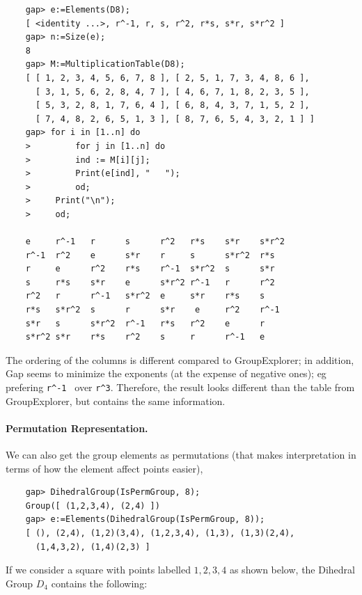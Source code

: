 \begin{verbatim}
    gap> e:=Elements(D8);
    [ <identity ...>, r^-1, r, s, r^2, r*s, s*r, s*r^2 ]
    gap> n:=Size(e);
    8
    gap> M:=MultiplicationTable(D8);
    [ [ 1, 2, 3, 4, 5, 6, 7, 8 ], [ 2, 5, 1, 7, 3, 4, 8, 6 ], 
	  [ 3, 1, 5, 6, 2, 8, 4, 7 ], [ 4, 6, 7, 1, 8, 2, 3, 5 ], 
      [ 5, 3, 2, 8, 1, 7, 6, 4 ], [ 6, 8, 4, 3, 7, 1, 5, 2 ], 
	  [ 7, 4, 8, 2, 6, 5, 1, 3 ], [ 8, 7, 6, 5, 4, 3, 2, 1 ] ]
    gap> for i in [1..n] do
    >         for j in [1..n] do
    >         ind := M[i][j];
    >         Print(e[ind], "   ");
    >         od;
    >     Print("\n");
    >     od;

    e     r^-1   r      s      r^2   r*s    s*r    s*r^2   
    r^-1  r^2    e      s*r    r     s      s*r^2  r*s   
    r     e      r^2    r*s    r^-1  s*r^2  s      s*r   
    s     r*s    s*r    e      s*r^2 r^-1   r      r^2   
    r^2   r      r^-1   s*r^2  e     s*r    r*s    s   
    r*s   s*r^2  s      r      s*r    e     r^2    r^-1   
    s*r   s      s*r^2  r^-1   r*s   r^2    e      r   
    s*r^2 s*r    r*s    r^2    s     r      r^-1   e   
\end{verbatim}

The ordering of the columns is different compared to GroupExplorer; in addition, Gap seems to minimize the exponents (at the expense of negative ones); eg prefering \verb+r^-1 + over \verb+r^3+. Therefore, the result looks different than the table from GroupExplorer, but contains the same information.

\paragraph{Permutation Representation.} We can also get the group elements as permutations (that makes interpretation in terms of how the element affect points easier),

\begin{verbatim}
    gap> DihedralGroup(IsPermGroup, 8);
    Group([ (1,2,3,4), (2,4) ])
    gap> e:=Elements(DihedralGroup(IsPermGroup, 8));
    [ (), (2,4), (1,2)(3,4), (1,2,3,4), (1,3), (1,3)(2,4), 
	  (1,4,3,2), (1,4)(2,3) ]
\end{verbatim}

If we consider a square with points labelled $1, 2, 3, 4$ as shown below, the Dihedral Group $D_4$ contains the following:

